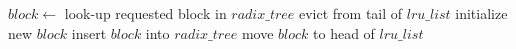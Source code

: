 \begin{algorithmic}
  \State $block \gets$ look-up requested block in $radix\_tree$
      \State evict from tail of $lru\_list$
    \EndIf
    \State initialize new $block$
    \State insert $block$ into $radix\_tree$
  \EndIf
  \State move $block$ to head of $lru\_list$
\end{algorithmic}